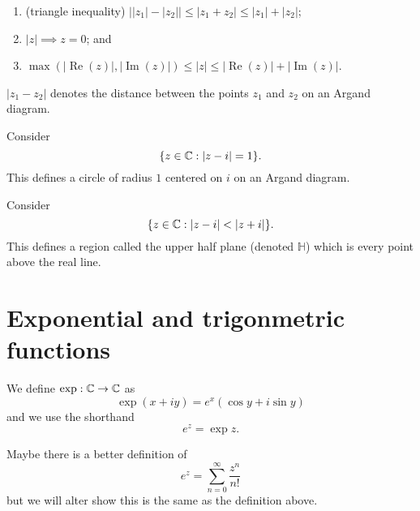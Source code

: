 \begin{proposition}
    \hspace{0em}
    \begin{enumerate}
       \item (triangle inequality) $\lvert \lvert z_1 \rvert - \lvert z_2 \rvert \rvert \leq \lvert z_1 + z_2 \rvert \leq \lvert z_1 \rvert + \lvert z_2 \rvert$;
       \item $\lvert z \rvert \implies z = 0$; and
       \item $\max(\lvert \operatorname{Re}{(z)} \rvert, \lvert \operatorname{Im}{(z)} \rvert) \leq \lvert z \rvert \leq \lvert \operatorname{Re}{(z)} \rvert + \lvert \operatorname{Im}{(z)} \rvert$.
    \end{enumerate} 
\end{proposition}

$\lvert z_1 - z_2 \rvert$ denotes the distance between the points $z_1$ and $z_2$ on an Argand diagram.

\begin{example}
    Consider \[ \{ z \in \mathbb{C} : \lvert z - i \rvert = 1 \}. \] This defines a circle of radius $1$ centered on $i$ on an Argand diagram.
\end{example}

\begin{example}
    Consider \[ \{ z \in \mathbb{C} : \lvert z - i \rvert < \lvert z + i \rvert \}. \] This defines a region called the upper half plane (denoted $\mathbb H$) which is every point above the real line.
\end{example}

\section{Exponential and trigonmetric functions}

\begin{definition}
    We define $\exp : \mathbb{C} \to \mathbb{C}$ as \[ \exp{(x + iy)} = e^x(\cos{y} + i\sin{y}) \] and we use the shorthand \[ e^z = \exp{z}. \]
\end{definition}

\begin{remark}
    Maybe there is a better definition of \[ e^z = \sum_{n=0}^{\infty} \frac{z^n}{n!} \] but we will alter show this is the same as the definition above. 
\end{remark}

